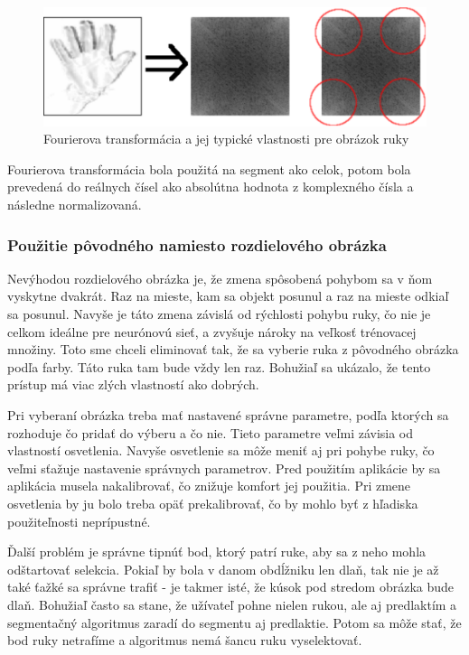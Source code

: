 \begin{figure}[htp]
    \centering
    \includegraphics[width=\textwidth]{images/fft_preview}
    \caption{Fourierova transformácia a jej typické vlastnosti pre obrázok ruky}
    \label{fig:fft}
\end{figure}

Fourierova transformácia bola použitá na segment ako celok, potom bola prevedená do reálnych čísel ako absolútna hodnota z komplexného čísla a následne normalizovaná.

\subsubsection{Použitie pôvodného namiesto rozdielového obrázka}
Nevýhodou rozdielového obrázka je, že zmena spôsobená pohybom sa v ňom vyskytne dvakrát. Raz na mieste, kam sa objekt posunul a raz na mieste odkiaľ sa posunul. Navyše je táto zmena závislá od rýchlosti pohybu ruky, čo nie je celkom ideálne pre neurónovú sieť, a zvyšuje nároky na veľkosť trénovacej množiny. Toto sme chceli eliminovať tak, že sa vyberie ruka z pôvodného obrázka podľa farby. Táto ruka tam bude vždy len raz. Bohužiaľ sa ukázalo, že tento prístup má viac zlých vlastností ako dobrých.

Pri vyberaní obrázka treba mať nastavené správne parametre, podľa ktorých sa rozhoduje čo pridať do výberu a čo nie. Tieto parametre veľmi závisia od vlastností osvetlenia. Navyše osvetlenie sa môže meniť aj pri pohybe ruky, čo veľmi sťažuje nastavenie správnych parametrov. Pred použitím aplikácie by sa aplikácia musela nakalibrovať, čo znižuje komfort jej použitia. Pri zmene osvetlenia by ju bolo treba opäť prekalibrovať, čo by mohlo byť z hľadiska použiteľnosti neprípustné.

Ďalší problém je správne tipnúť bod, ktorý patrí ruke, aby sa z neho mohla odštartovať selekcia. Pokiaľ by bola v danom obdĺžniku len dlaň, tak nie je až také ťažké sa správne trafiť - je takmer isté, že kúsok pod stredom obrázka bude dlaň. Bohužiaľ často sa stane, že užívateľ pohne nielen rukou, ale aj predlaktím a segmentačný algoritmus zaradí do segmentu aj predlaktie. Potom sa môže stať, že bod ruky netrafíme a algoritmus nemá šancu ruku vyselektovať.

